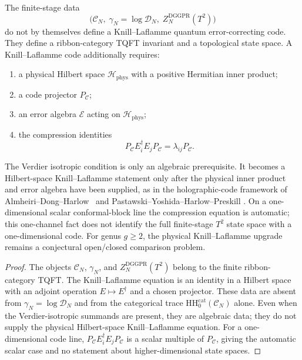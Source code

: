 \begin{proposition}
\label{prop:ent-kl-scope}
The finite-stage data
\[
 \bigl(\mathcal C_N,\; \gamma_N=\log\mathcal D_N,\;
 Z_N^{\mathrm{DGGPR}}(T^2)\bigr)
\]
do not by themselves define a Knill--Laflamme quantum
error-correcting code.  They define a ribbon-category TQFT invariant
and a topological state space.  A Knill--Laflamme code additionally
requires:
\begin{enumerate}[label=\textup{(\roman*)}]
\item a physical Hilbert space $\mathcal H_{\mathrm{phys}}$ with a
 positive Hermitian inner product;
\item a code projector $P_{\mathcal C}$;
\item an error algebra $\mathcal E$ acting on
 $\mathcal H_{\mathrm{phys}}$;
\item the compression identities
 \[
  P_{\mathcal C} E_i^\dagger E_j P_{\mathcal C}
  =\lambda_{ij}P_{\mathcal C}.
 \]
\end{enumerate}
The Verdier isotropic condition is only an algebraic prerequisite.
It becomes a Hilbert-space Knill--Laflamme statement only after the
physical inner product and error algebra have been supplied, as in the holographic-code
framework of Almheiri--Dong--Harlow~\cite{Almheiri-Dong-Harlow15}
and Pastawski--Yoshida--Harlow--Preskill
\cite{Pastawski-Yoshida-Harlow-Preskill15}.  On a one-dimensional
scalar conformal-block line the compression equation is automatic;
this one-channel fact does not identify the full finite-stage
$T^2$ state space with a one-dimensional code.  For genus $g\ge2$,
the physical Knill--Laflamme upgrade remains a conjectural
open/closed comparison problem.
\end{proposition}

\begin{proof}
The objects $\mathcal C_N$, $\gamma_N$, and
$Z_N^{\mathrm{DGGPR}}(T^2)$ belong to the finite ribbon-category
TQFT.  The Knill--Laflamme equation is an
identity in a Hilbert space with an adjoint operation
$E\mapsto E^\dagger$ and a chosen projector.  These data are absent
from $\gamma_N=\log\mathcal D_N$ and from the categorical trace
$\mathrm{HH}^{\mathrm{cat}}_0(\mathcal C_N)$ alone.
Even when the Verdier-isotropic summands are present, they are
algebraic data; they do not supply the physical Hilbert-space
Knill--Laflamme equation.  For a
one-dimensional code line,
$P_{\mathcal C}E_i^\dagger E_jP_{\mathcal C}$ is a scalar multiple of
$P_{\mathcal C}$, giving the automatic scalar case and no statement
about higher-dimensional state spaces.
\end{proof}

